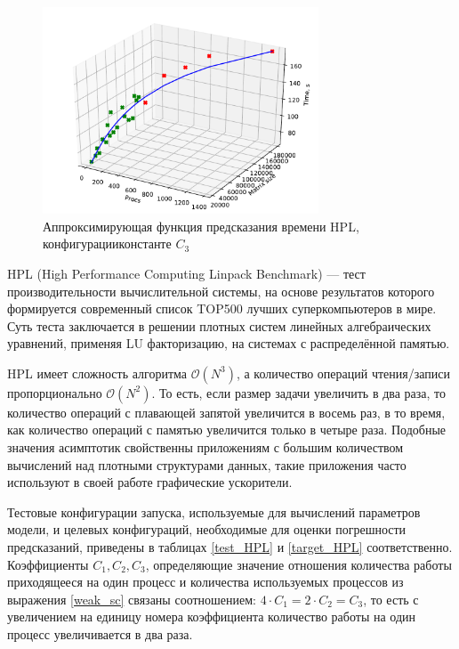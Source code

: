 		\begin{figure}
			\centering
			\includegraphics[width=0.73\textwidth]{./images/fig_hpl_k3}
			\caption{Аппроксимирующая функция предсказания времени HPL, конфигурации константе \(C_3\)}
			\label{figure_HPL_C_3}
		\end{figure}
		HPL (High Performance Computing Linpack Benchmark) — тест производительности вычислительной системы, на основе результатов которого формируется современный список TOP500 \cite{top500} лучших суперкомпьютеров в мире. Суть теста заключается в решении плотных систем линейных алгебраических уравнений, применяя LU факторизацию, на системах с распределённой памятью.

		HPL имеет сложность алгоритма \(\mathcal{O}(N^3)\), а количество операций чтения/записи пропорционально \(\mathcal{O}(N^2)\). То есть, если размер задачи увеличить в два раза, то количество операций с плавающей запятой увеличится в восемь раз, в то время, как количество операций с памятью увеличится только в четыре раза. Подобные значения асимптотик свойственны приложениям с большим количеством вычислений над плотными структурами данных, такие приложения часто используют в своей работе графические ускорители.

		Тестовые конфигурации запуска, используемые для вычислений параметров модели, и целевых конфигураций, необходимые для оценки погрешности предсказаний, приведены в таблицах \eqref{test_HPL} и \eqref{target_HPL} соответственно. Коэффициенты \(C_1, C_2, C_3\), определяющие значение отношения количества работы приходящееся на один процесс и количества используемых процессов из выражения \eqref{weak_sc} связаны соотношением: \(4 \cdot C_1 = 2 \cdot C_2 = C_3 \), то есть с увеличением на единицу номера коэффициента количество работы на один процесс увеличивается в два раза.

